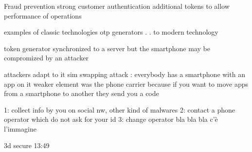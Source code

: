 Fraud prevention 
    strong customer authentication 
        additional tokens to allow performance of operations 

        examples of classic technologies 
            otp generators
            . 
            .
            to modern technology 

        token generator synchronized to a server 
            but the smartphone may be compromized by an attacker 

        attackers adapt to it 
            sim swapping attack : 
                everybody has a smartphone with an app on it 
                    weaker element was the phone carrier 
                    because if you want to move apps from a smartphone to another
                    they send you a code 

                    1: collect info by you on social nw, other kind of malwares
                    2: contact a phone operator which do not ask for your id
                    3: change operator 
                    bla bla bla c'è l'immagine 

        3d secure 13:49


        